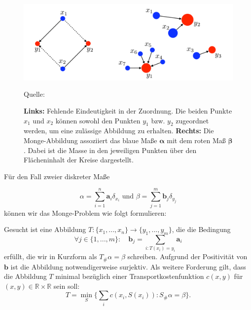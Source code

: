 \documentclass[twoside, 12pt,a4paper]{book}
\newcommand{\source}[1]{\caption*{\hfill Quelle: {#1}} }
\numberwithin{equation}{section}
\begin{document}
	\begin{figure}[ht]
		\centering
		\includegraphics[width=0.3\textheight]{monge_mapping.png}
		\caption[Monge-Abbildung]{\textbf{Links:} Fehlende Eindeutigkeit in der Zuordnung. Die beiden Punkte $x_1$ und $x_2$ können sowohl den Punkten $y_1$ bzw. $y_2$ zugeordnet werden, um eine zulässige Abbildung zu erhalten. \textbf{Rechts:} Die Monge-Abbildung assoziiert das blaue Maße $\boldsymbol{\alpha}$ mit dem roten Maß $\boldsymbol{\beta}$. Dabei ist die Masse in den jeweiligen Punkten über den Flächeninhalt der Kreise dargestellt.}
		\source{\cite{COTcuturi}}
		\label{im:monge_mapping}
	\end{figure}
	
	
	
	
	
	\noindent Für den Fall zweier diskreter Maße
	
	\begin{equation}
	\alpha = \sum_{i=1}^n{\boldsymbol{a}_i\delta_{x_i}} \text{ und } \beta = \sum_{j=1}^m{\boldsymbol{b}_j\delta_{y_j}}
	\end{equation}
	können wir das Monge-Problem  wie folgt formulieren:
	
	\noindent Gesucht ist eine Abbildung $T:\lbrace x_1, ..., x_n \rbrace \to \lbrace y_1,...,y_m \rbrace$, die die Bedingung 
	\begin{equation}
	\forall j \in \lbrace 1,...,m \rbrace: \quad \boldsymbol{b}_j= \sum_{i:T(x_i)=y_i}{\boldsymbol{a}_i}
	\end{equation}
	erfüllt, die wir in Kurzform als $T_\#\alpha = \beta$ schreiben. Aufgrund der Positivität von $\boldsymbol{b}$ ist die Abbildung notwendigerweise surjektiv.
	Als weitere Forderung gilt, dass die Abbildung $T$ minimal bezüglich einer Transportkostenfunktion $c(x,y)$ für $(x,y) \in \mathbb{R} \times \mathbb{R}$ sein soll:
	\begin{equation}
	T = \min_S{\Big\{ \sum_i{c(x_i, S(x_i)) : S_\#\alpha =  \beta} \Big\}}.
	\end{equation} 
	
\end{document}
